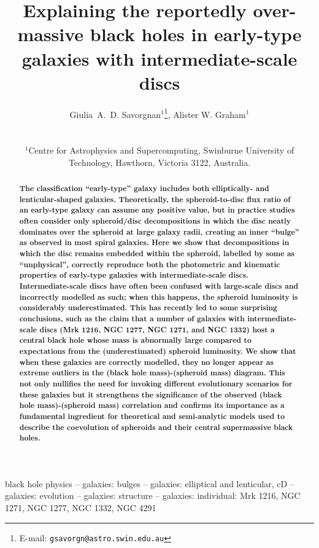 \documentclass[useAMS,usenatbib,article]{mnras}
\title[Explaining the reportedly over-massive black holes]
{Explaining the reportedly over-massive black holes in early-type galaxies with intermediate-scale discs}
\author[G.~A.~D. Savorgnan \& A.~W. Graham]
{\parbox{\textwidth}{
Giulia~A.~D. Savorgnan$^{1}$\thanks{E-mail: \texttt{gsavorgn@astro.swin.edu.au}},
Alister W. Graham$^{1}$}\vspace{0.4cm}\\
\parbox{\textwidth}{
$^{1}$Centre for Astrophysics and Supercomputing, Swinburne University of Technology, Hawthorn, Victoria 3122, Australia.\\}}
\begin{document}
\maketitle

\label{firstpage}



\begin{abstract}
{\bf The classification ``early-type'' galaxy includes both elliptically- and lenticular-shaped galaxies. 
Theoretically, the spheroid-to-disc flux ratio of an early-type galaxy can assume any positive value,  
but in practice studies often consider only spheroid/disc decompositions 
in which the disc neatly dominates over the spheroid at large galaxy radii, 
creating an inner ``bulge'' as observed in most spiral galaxies. 
Here we show that decompositions in which the disc remains embedded within the spheroid, 
labelled by some as ``unphysical'',  
correctly reproduce both the photometric and kinematic properties of early-type galaxies 
with intermediate-scale discs. 
Intermediate-scale discs have often been confused with large-scale discs and incorrectly modelled as such; 
when this happens, the spheroid luminosity is considerably underestimated. 
This has recently led to some surprising conclusions, 
such as the claim that a number of galaxies with intermediate-scale discs (Mrk 1216, NGC 1277, NGC 1271, and NGC 1332) 
host a central black hole whose mass is abnormally large compared to expectations from the (underestimated) spheroid luminosity. 
We show that when these galaxies are correctly modelled, 
they no longer appear as extreme outliers in the (black hole mass)-(spheroid mass) diagram. 
This not only nullifies the need for invoking different evolutionary scenarios for these galaxies 
but it strengthens the significance of the observed (black hole mass)-(spheroid mass) correlation 
and confirms its importance as a fundamental ingredient for theoretical and semi-analytic models 
used to describe the coevolution of spheroids and their central supermassive black holes. }

\end{abstract}

\begin{keywords}
black hole physics -- galaxies: bulges -- galaxies: elliptical and lenticular, cD -- 
galaxies: evolution -- galaxies: structure -- galaxies: individual: Mrk 1216, NGC 1271, NGC 1277, NGC 1332, NGC 4291
\end{keywords}
\end{document}
